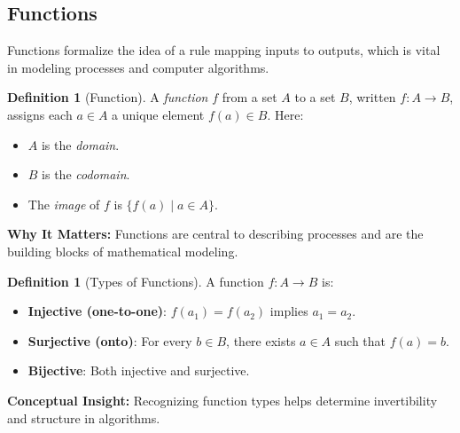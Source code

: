 \documentclass[12pt]{article}
\theoremstyle{definition}
\newtheorem{definition}[theorem]{Definition}
\begin{document}
\subsection{Functions}

Functions formalize the idea of a rule mapping inputs to outputs, which is vital in modeling processes and computer algorithms.

\begin{definition}[Function]
  A \emph{function} \(f\) from a set \(A\) to a set \(B\), written \(f: A \to B\), assigns each \(a \in A\) a unique element \(f(a) \in B\). Here:
  \begin{itemize}[itemsep=3pt]
    \item \(A\) is the \emph{domain}.
    \item \(B\) is the \emph{codomain}.
    \item The \emph{image} of \(f\) is \(\{ f(a) \mid a \in A \}\).
  \end{itemize}
  \vspace{0.5em}
  \textbf{Why It Matters:} Functions are central to describing processes and are the building blocks of mathematical modeling.
\end{definition}

\begin{center}
\end{center}

\begin{definition}[Types of Functions]
  A function \(f: A \to B\) is:
  \begin{itemize}[itemsep=3pt]
    \item \textbf{Injective (one-to-one)}: \(f(a_1)=f(a_2)\) implies \(a_1 = a_2\).
    \item \textbf{Surjective (onto)}: For every \(b \in B\), there exists \(a \in A\) such that \(f(a)=b\).
    \item \textbf{Bijective}: Both injective and surjective.
  \end{itemize}
  \vspace{0.5em}
  \textbf{Conceptual Insight:} Recognizing function types helps determine invertibility and structure in algorithms.
\end{definition}
\end{document}
